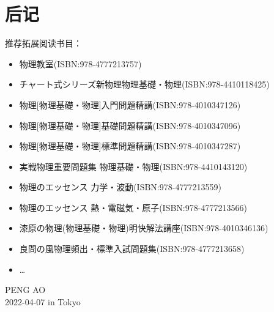 
\chapter{后记}

推荐拓展阅读书目：
\begin{itemize}
    \item 物理教室(ISBN:978-4777213757)
    \item チャート式シリーズ新物理物理基礎・物理(ISBN:978-4410118425)
    \item 物理[物理基礎・物理]入門問題精講(ISBN:978-4010347126)
    \item 物理[物理基礎・物理]基礎問題精講(ISBN:978-4010347096)
    \item 物理[物理基礎・物理]標準問題精講(ISBN:978-4010347287)
    \item 実戦物理重要問題集 物理基礎・物理(ISBN:978-4410143120)
    \item 物理のエッセンス 力学・波動(ISBN:978-4777213559)
    \item 物理のエッセンス 熱・電磁気・原子(ISBN:978-4777213566)
    \item 漆原の物理(物理基礎・物理)明快解法講座(ISBN:978-4010346136)
    \item 良問の風物理頻出・標準入試問題集(ISBN:978-4777213658)
    \item \ldots
\end{itemize}

\vfill
\begin{flushright}
    PENG AO\\
    2022-04-07 in Tokyo
\end{flushright}
